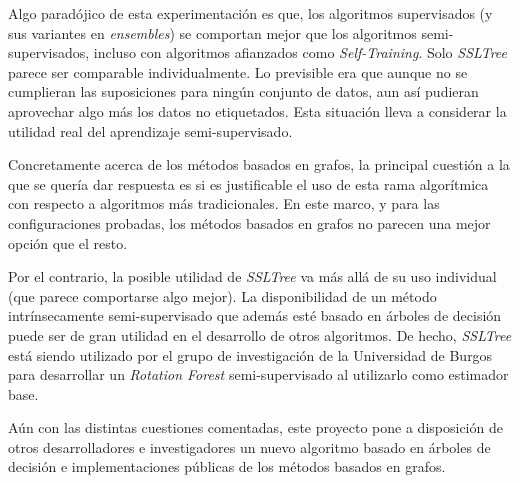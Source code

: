 Algo paradójico de esta experimentación es que, los algoritmos supervisados (y sus variantes en \textit{ensembles}) se comportan mejor que los algoritmos semi-supervisados, incluso con algoritmos afianzados como \textit{Self-Training}. Solo \textit{SSLTree} parece ser comparable individualmente. Lo previsible era que aunque no se cumplieran las suposiciones para ningún conjunto de datos, aun así pudieran aprovechar algo más los datos no etiquetados. Esta situación lleva a considerar la utilidad real del aprendizaje semi-supervisado.

Concretamente acerca de los métodos basados en grafos, la principal cuestión a la que se quería dar respuesta es si es justificable el uso de esta rama algorítmica con respecto a algoritmos más tradicionales. En este marco, y para las configuraciones probadas, los métodos basados en grafos no parecen una mejor opción que el resto.

Por el contrario, la posible utilidad de \textit{SSLTree} va más allá de su uso individual (que parece comportarse algo mejor). La disponibilidad de un método intrínsecamente semi-supervisado que además esté basado en árboles de decisión puede ser de gran utilidad en el desarrollo de otros algoritmos. De hecho, \textit{SSLTree} está siendo utilizado por el grupo de investigación de la Universidad de Burgos para desarrollar un \textit{Rotation Forest} semi-supervisado al utilizarlo como estimador base.

Aún con las distintas cuestiones comentadas, este proyecto pone a disposición de otros desarrolladores e investigadores un nuevo algoritmo basado en árboles de decisión e implementaciones públicas de los métodos basados en grafos.

